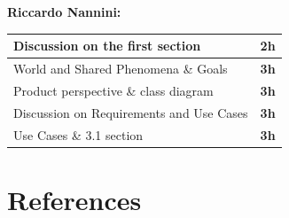 \documentclass[]{article}
\begin{document}
		

	
	\textbf{\large \\ \\ Riccardo Nannini:} \\ \newline
		\begin{tabular}{|l|c|}
			\hline
			Discussion on the first section &  \textbf{2h} \\ \hline
			\rowcolor[HTML]{DCDCDC} 
			World and Shared Phenomena \& Goals & \textbf{3h} \\ \hline
			Product perspective \& class diagram & \textbf{3h} \\ \hline
			\rowcolor[HTML]{DCDCDC} 
			Discussion on Requirements and Use Cases & \textbf{3h} \\ \hline
			Use Cases \& 3.1 section & \textbf{3h} \\ \hline
		\end{tabular}
	
	\section{References}				
	
\end{document}
